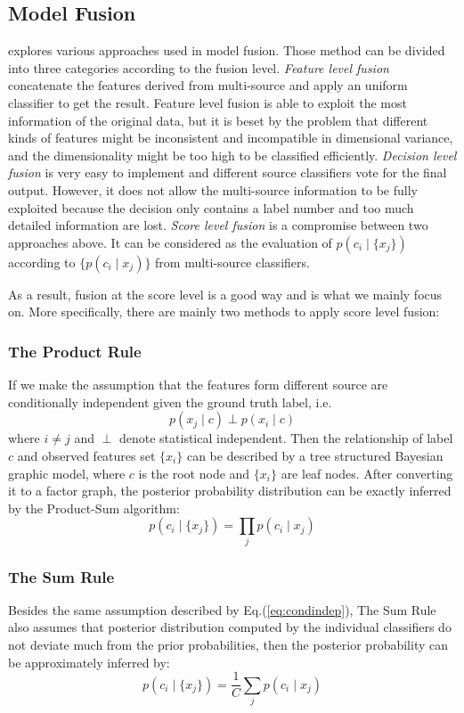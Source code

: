 \documentclass[conference]{IEEEtran}
\newcommand{\eqref}[1]{Eq.(\ref{#1})}
\begin{document}
\subsection{Model Fusion}
\cite{Xu2015Adaptive} explores various approaches used in model fusion. Those method can be divided into three categories according to the fusion level. \emph{Feature level fusion} concatenate the features derived from multi-source and apply an uniform classifier to get the result. Feature level fusion is able to exploit the most information of the original data, but it is beset by the problem that different kinds of features might be inconsistent and incompatible in dimensional variance, and the dimensionality might be too high to be classified efficiently. \emph{Decision level fusion} is very easy to implement and different source classifiers vote for the final output. However, it does not allow the multi-source information to be fully exploited because the decision only contains a label number and too much detailed information are lost. \emph{Score level fusion} is a compromise between two approaches above. It can be considered as the evaluation of $p(c_i\mid \{x_j\})$ according to $\{p(c_i\mid x_j)\}$ from multi-source classifiers.

As a result, fusion at the score level is a good way and is what we mainly focus on. More specifically, there are mainly two methods to apply score level fusion:

\subsubsection{The Product Rule}
If we make the assumption that the features form different source are conditionally independent given the ground truth label, i.e.
\begin{equation}
\label{eq:condindep}
p(x_j\mid c)\perp p(x_i\mid c)
\end{equation}
where $i\neq j$ and $\perp$ denote statistical independent. Then the relationship of label $c$ and observed features set $\{x_i\}$ can be described by a tree structured Bayesian graphic model, where $c$ is the root node and $\{x_i\}$ are leaf nodes. After converting it to a factor graph, the posterior probability distribution can be exactly inferred by the Product-Sum algorithm:
\begin{equation}
\label{eq:prodrule}
p(c_i\mid \{x_j\})=\prod_j p(c_i\mid x_j)
\end{equation}

\subsubsection{The Sum Rule}
Besides the same assumption described by \eqref{eq:condindep}, The Sum Rule also assumes that posterior distribution computed by the individual classifiers do not deviate much from the prior probabilities, then the posterior probability can be approximately inferred by:
\begin{equation}
\label{eq:sumrule}
p(c_i\mid \{x_j\})=\frac{1}{C}\sum_j p(c_i\mid x_j)
\end{equation}
\end{document}
